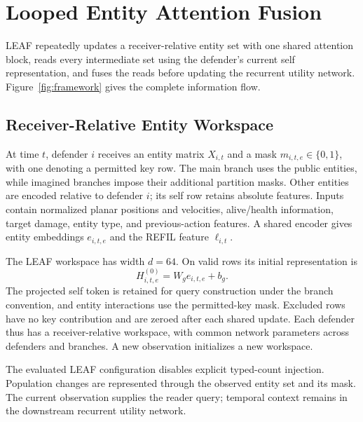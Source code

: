 \section{Looped Entity Attention Fusion}
\label{sec:method}
LEAF repeatedly updates a receiver-relative entity set with one shared attention block, reads every intermediate set using the defender's current self representation, and fuses the reads before updating the recurrent utility network. Figure~\ref{fig:framework} gives the complete information flow.

\subsection{Receiver-Relative Entity Workspace}
At time $t$, defender $i$ receives an entity matrix $X_{i,t}$ and a mask $m_{i,t,e}\in\{0,1\}$, with one denoting a permitted key row. The main branch uses the public entities, while imagined branches impose their additional partition masks. Other entities are encoded relative to defender $i$; its self row retains absolute features. Inputs contain normalized planar positions and velocities, alive/health information, target damage, entity type, and previous-action features. A shared encoder gives entity embeddings $e_{i,t,e}$ and the REFIL feature $\ell_{i,t}$.

The LEAF workspace has width $d=64$. On valid rows its initial representation is
\begin{equation}
 H^{(0)}_{i,t,e}=W_g e_{i,t,e}+b_g.
 \label{eq:workspace}
\end{equation}
The projected self token is retained for query construction under the branch convention, and entity interactions use the permitted-key mask. Excluded rows have no key contribution and are zeroed after each shared update. Each defender thus has a receiver-relative workspace, with common network parameters across defenders and branches. A new observation initializes a new workspace.

The evaluated LEAF configuration disables explicit typed-count injection. Population changes are represented through the observed entity set and its mask. The current observation supplies the reader query; temporal context remains in the downstream recurrent utility network.

